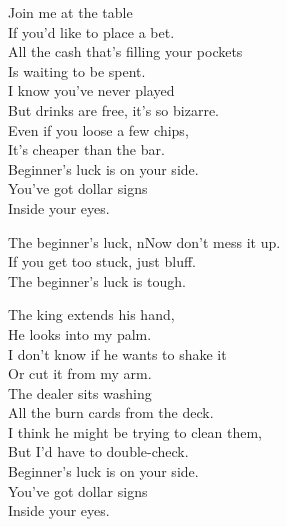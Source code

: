 
\label{album:gumboot-soup}





Join me at the table \\
If you'd like to place a bet. \\
All the cash that's filling your pockets \\
Is waiting to be spent. \\

I know you've never played \\
But drinks are free, it's so bizarre. \\
Even if you loose a few chips, \\
It's cheaper than the bar. \\

Beginner's luck is on your side. \\
You've got dollar signs \\
Inside your eyes. \\


The beginner's luck, nNow don't mess it up. \\
If you get too stuck, just bluff. \\
The beginner's luck is tough. \\


The king extends his hand, \\
He looks into my palm. \\
I don't know if he wants to shake it \\
Or cut it from my arm. \\

The dealer sits washing \\
All the burn cards from the deck. \\
I think he might be trying to clean them, \\
But I'd have to double-check. \\

Beginner's luck is on your side. \\
You've got dollar signs \\
Inside your eyes. \\


